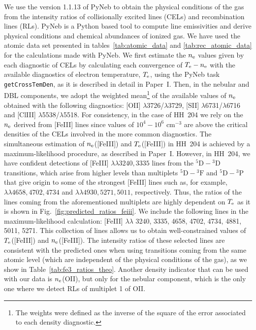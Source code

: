 \documentclass[twocolumn]{aastex63}
\begin{document}
We use the version 1.1.13 of PyNeb \citep{Luridiana15} to obtain the physical conditions of the gas from the intensity ratios of collisionally excited lines (CELs) and recombination lines (RLs). PyNeb is a Python based tool to compute line emissivities and derive physical conditions and chemical abundances of ionized gas. We have used the atomic data set presented in tables~\ref{tab:atomic_data} and \ref{tab:rec_atomic_data} for the calculations made with PyNeb. We first estimate the $n_{\rm e}$ values given by each diagnostic of CELs by calculating each convergence of $T_{\rm e}-n_{\rm e}$ with the available diagnostics of electron temperature, $T_{\rm e}$, using the PyNeb task \texttt{getCrossTemDen}, as it is described in detail in Paper~I. Then, in the nebular and DBL components, we adopt the weighted mean\footnote{The weights were defined as the inverse of the square of the error associated to each density diagnostic.} of the available values of $n_{\rm e}$ obtained with the following diagnostics: [O\thinspace II] $\lambda$3726/$\lambda$3729, [S\thinspace II] $\lambda$6731/$\lambda$6716 and [Cl\thinspace III] $\lambda$5538/$\lambda$5518. For consistency, in the case of HH~204 we rely on the $n_{\rm e}$ derived from [Fe\thinspace III] lines since values of $10^4-10^6 \text{ cm}^{-3}$ are above the critical densities of the CELs involved in the more common diagnostics. The simultaneous estimation of $n_{\rm e}$([Fe\thinspace III]) and $T_{\rm e}$([Fe\thinspace III]) in HH~204 is achieved by a maximum-likelihood procedure, as described in Paper~I. However, in HH~204, we have confident detections of [Fe\thinspace III] $\lambda \lambda 3240, 3335$ lines from the $^5\text{D}-{^3}\text{D}$ transitions, which arise from higher levels than multiplets $^5\text{D}-{^3}\text{F}$ and $^5\text{D}-{^3}\text{P}$ that give origin to some of the strongest [Fe\thinspace III] lines such as, for example, $\lambda \lambda 4658, 4702, 4734$ and $\lambda \lambda 4930, 5271, 5011$, respectively. Thus, the ratios of the lines coming from the aforementioned multiplets are highly dependent on $T_{\rm e}$ as it is shown in Fig.~\ref{fig:predicted_ratios_feiii}. We include the following lines in the maximum-likelihood calculation: [Fe\thinspace III] $\lambda \lambda$ 3240, 3335, 4658, 4702, 4734, 4881, 5011, 5271. This collection of lines allows us to obtain well-constrained values of $T_{\rm e}$([Fe\thinspace III]) and $n_{\rm e}$([Fe\thinspace III]). The intensity ratios of these selected lines are consistent with the predicted ones when using transitions coming from the same atomic level (which are independent of the physical conditions of the gas), as we  show in Table~\ref{tab:fe3_ratios_theo}. %
Another density indicator that can be used with our data is $n_{\rm e}$(O\thinspace II), but only for the nebular component, which is the only one where we detect RLs of multiplet 1 of O\thinspace II.
\end{document}
